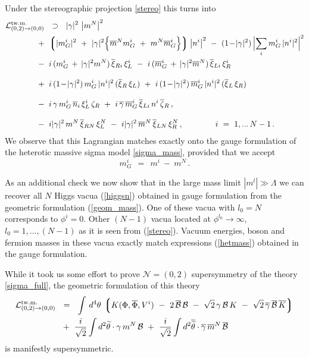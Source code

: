 \documentclass[12pt]{article}
\newcommand{\ntwoo}{${\mathcal N}= \left(0,2\right) $ }
\newcommand{\wt}{\widetilde}
\newcommand{\ov}{\overline}
\newcommand{\mc}[1]{\mathcal{#1}}
\newcommand{\lgr}{\left\lgroup}
\newcommand{\rgr}{\right\rgroup}
\newcommand{\bxir}{\ov{\xi}{}_R}
\newcommand{\bxil}{\ov{\xi}{}_L}
\newcommand{\xir}{\xi_R}
\newcommand{\xil}{\xi_L}
\newcommand{\bzr}{\ov{\zeta}{}_R}
\newcommand{\zr}{\zeta_R}
\newcommand{\bgamma}{\ov{\gamma}}
\newcommand{\bxi}{\ov{\xi}{}}
\begin{document}
	Under the stereographic projection \eqref{stereo} this turns into
\begin{align*}
%
	\mc{L}_{(0,2)\to(0,0)}^\text{tw.m.} & 
	~~\supset~~ 
	|\gamma|^2\, \left|m^N\right|^2 
	\\
%
	&\!\!\!\!\!\!\!\!
	~+~
	\lgr |m_G^i|^2 ~+~
		|\gamma|^2 \Bigl\{ \ov{m}{}^N m_G^i ~+~ m^N \ov{m}{}_G^i \Bigr\} \rgr \left|n^i \right|^2 
	~-~ (1 \!-\! |\gamma|^2)\, \Bigl| \sum_i m_G^i\, |n^i|^2 \Bigr|^2 
	\\
%
	&\!\!\!\!\!\!\!\!
	~-~ i\, ( m_G^i \,+\, |\gamma|^2 m^N )\, \bxi_{Ri}\, \xi_L^i
	~-~ i\, (\ov{m}{}_G^i \,+\, |\gamma|^2 \ov{m}{}^N )\, \bxi_{Li}\, \xi_R^i
	\\[3mm]
%
	&\!\!\!\!\!\!\!\!
	~+~ i\,(1\!-\!|\gamma|^2)\, m_G^i\,|n^i|^2\, (\bxir\,\xil) 
	~+~ i\,(1\!-\!|\gamma|^2)\, \ov{m}{}_G^i\,|n^i|^2\, (\bxil\,\xir)
	\\[3mm]
%
	&\!\!\!\!\!\!\!\!
	~-~ i\,\gamma\, m_G^i\,\ov{n}{}_i\, \xi_L^i\, \zr
	~+~ i\,\bgamma\, \ov{m}{}_G^i\, \bxi_{Li}\, n^i\, \bzr\,,
	\\[3mm]
%
	&\!\!\!\!\!\!\!\!
	~-~ i |\gamma|^2\, m^N\, \ov{\xi}{}_{RN}\, \xi_L^N
	~-~ i |\gamma|^2\, \ov{m}^N\, \ov{\xi}{}_{LN}\, \xi_R^N\,,
	\qquad\qquad
	i ~=~ 1,...\,N-1\,.
\end{align*}
	We observe that this Lagrangian matches exactly
	onto the gauge formulation of the heterotic massive sigma model \eqref{sigma_mass}, provided that
	we accept
\[
	m_G^i ~~=~~ m^i ~-~ m^N \,.
\]

As an additional check we now show that in the 
large  mass limit $|m^l|\gg \Lambda$ we can
recover all $N$ Higgs vacua (\ref{higgsn}) obtained in
gauge formulation from the geometric formulation (\ref{geom_mass}). One of these vacua with $l_0=N$ corresponds
to $\phi^i=0$. Other $(N-1)$ vacua located at $\phi^{l_0}\to\infty$, $l_0=1,...,(N-1)$ as it is seen from 
(\ref{stereo}). Vacuum energies, boson and fermion masses 
in these vacua exactly match expressions (\ref{hetmass})
obtained in the gauge formulation.




	While it took us some effort to prove \ntwoo supersymmetry of the theory \eqref{sigma_full},
	the geometric formulation of this theory 
\begin{align*}
	\mc{L}_{(0,2)\to(0,0)}^\text{tw.m.} & 
	~~=~~ \int\, d^4\theta\, \lgr K(\Phi,\ov{\Phi}, V^i) 
		~-~ 2\, \ov{\mc{B}}\,\mc{B}  
		~-~  \sqrt{2}\, \gamma\,\mc{B}\,K  ~-~ \sqrt{2}\, \ov{\gamma}\,\ov{\mc{B}}\,\ov{K} \rgr
	\\
%
	&~
	~+~ \frac{i}{\sqrt{2}} \int d^2\wt{\theta} \cdot \gamma\,m^N\,\mc{B} 
	~+~ \frac{i}{\sqrt{2}} \int d^2\ov{\wt{\theta}} \cdot \bgamma\, \ov{m}{}^N\, \ov{\mc{B}}
\end{align*}
	is manifestly supersymmetric.
	
\end{document}
